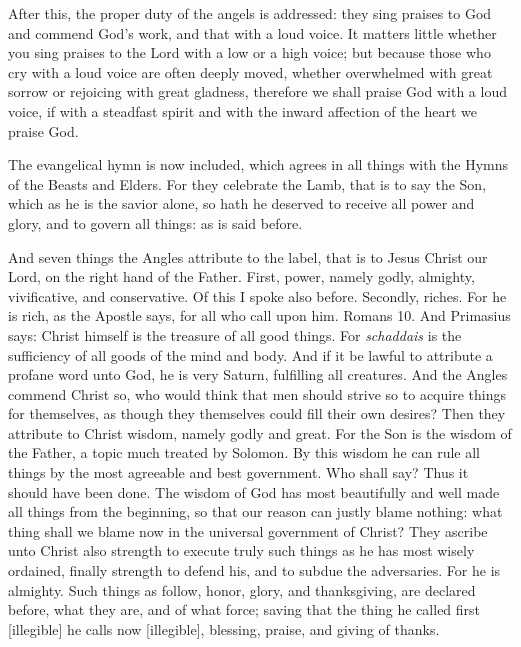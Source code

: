 After this, the proper duty of the angels is addressed: they sing praises to God and commend God’s work, and that with a loud voice. It matters little whether you sing praises to the Lord with a low or a high voice; but because those who cry with a loud voice are often deeply moved, whether overwhelmed with great sorrow or rejoicing with great gladness, therefore we shall praise God with a loud voice, if with a steadfast spirit and with the inward affection of the heart we praise God.

The evangelical hymn is now included, which agrees in all things with the Hymns of the Beasts and Elders. For they celebrate the Lamb, that is to say the Son, which as he is the savior alone, so hath he deserved to receive all power and glory, and to govern all things: as is said before.

And seven things the Angles attribute to the label, that is to Jesus Christ our Lord, on the right hand of the Father. First, power, namely godly, almighty, vivificative, and conservative. Of this I spoke also before. Secondly, riches. For he is rich, as the Apostle says, for all who call upon him. Romans 10. And Primasius says: Christ himself is the treasure of all good things. For \textit{schaddais} is the sufficiency of all goods of the mind and body. And if it be lawful to attribute a profane word unto God, he is very Saturn, fulfilling all creatures. And the Angles commend Christ so, who would think that men should strive so to acquire things for themselves, as though they themselves could fill their own desires? Then they attribute to Christ wisdom, namely godly and great. For the Son is the wisdom of the Father, a topic much treated by Solomon. By this wisdom he can rule all things by the most agreeable and best government. Who shall say? Thus it should have been done. The wisdom of God has most beautifully and well made all things from the beginning, so that our reason can justly blame nothing: what thing shall we blame now in the universal government of Christ? They ascribe unto Christ also strength to execute truly such things as he has most wisely ordained, finally strength to defend his, and to subdue the adversaries. For he is almighty. Such things as follow, honor, glory, and thanksgiving, are declared before, what they are, and of what force; saving that the thing he called first [illegible] he calls now [illegible], blessing, praise, and giving of thanks.

